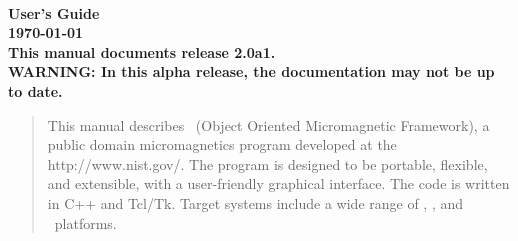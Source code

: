 
\usepackage{l2hbugs}

%
%
%
\usepackage{tocloft}
\newlength{\oommftocsslen}
\setlength{\oommftocsslen}{0.5em} %
\renewcommand{\cftsubsecpresnum}{\hfill} %
\renewcommand{\cftsubsecaftersnum}{\hspace*{\oommftocsslen}}
\addtolength{\cftsubsecnumwidth}{\oommftocsslen}
%
%




\nocite{*}  %


\begin{titlepage}
\label{page:contents}
\par
\vspace*{\fill}
\begin{center}
\Large\bf
\OOMMF\\
User's Guide\\[2ex]
\large
{\today}
{}\\[2ex]
This manual documents release 2.0a1.\\[1ex]
WARNING: In this alpha release, the
documentation may not be up to date.

\end{center}
\vspace{10\baselineskip}
\begin{abstract}
This manual describes \OOMMF\ (Object Oriented Micromagnetic Framework),
a public domain micromagnetics program developed at the
{http://www.nist.gov/}.  The program is designed
to be portable, flexible, and extensible, with a user-friendly graphical
interface.  The code is written in C++ and Tcl/Tk. Target systems
include a wide range of \Unix, \Windows, and \MacOSX\ platforms.
\end{abstract}
\vspace*{\fill}
\par
\end{titlepage}

